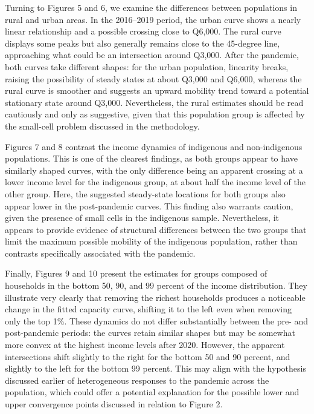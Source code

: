 \documentclass{article}
\begin{document}
Turning to Figures 5 and 6, we examine the differences between populations in rural and urban areas. In the 2016--2019 period, the urban curve shows a nearly linear relationship and a possible crossing close to Q6,000. The rural curve displays some peaks but also generally remains close to the 45-degree line, approaching what could be an intersection around Q3,000. After the pandemic, both curves take different shapes: for the urban population, linearity breaks, raising the possibility of steady states at about Q3,000 and Q6,000, whereas the rural curve is smoother and suggests an upward mobility trend toward a potential stationary state around Q3,000. Nevertheless, the rural estimates should be read cautiously and only as suggestive, given that this population group is affected by the small-cell problem discussed in the methodology.

Figures 7 and 8 contrast the income dynamics of indigenous and non-indigenous populations. This is one of the clearest findings, as both groups appear to have similarly shaped curves, with the only difference being an apparent crossing at a lower income level for the indigenous group, at about half the income level of the other group. Here, the suggested steady-state locations for both groups also appear lower in the post-pandemic curves. This finding also warrants caution, given the presence of small cells in the indigenous sample. Nevertheless, it appears to provide evidence of structural differences between the two groups that limit the maximum possible mobility of the indigenous population, rather than contrasts specifically associated with the pandemic.

Finally, Figures 9 and 10 present the estimates for groups composed of households in the bottom 50, 90, and 99 percent of the income distribution. They illustrate very clearly that removing the richest households produces a noticeable change in the fitted capacity curve, shifting it to the left even when removing only the top 1\%. These dynamics do not differ substantially between the pre- and post-pandemic periods: the curves retain similar shapes but may be somewhat more convex at the highest income levels after 2020. However, the apparent intersections shift slightly to the right for the bottom 50 and 90 percent, and slightly to the left for the bottom 99 percent. This may align with the hypothesis discussed earlier of heterogeneous responses to the pandemic across the population, which could offer a potential explanation for the possible lower and upper convergence points discussed in relation to Figure 2.
\end{document}
